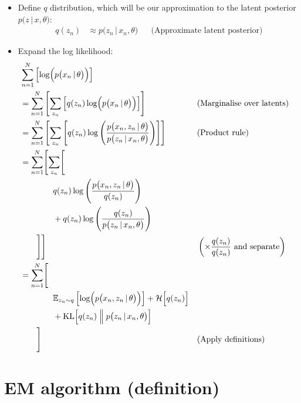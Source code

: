 \documentclass{article}
\begin{document}
\begin{itemize}
    \item Define $q$ distribution, which will be our approximation to the latent posterior $p\bigl( z \,\vert\, x, \theta \bigr)$:
    \begin{align}
        q(z_n) &\approx p\bigl( z_n \,\vert\, x_n, \theta \bigr) && \text{(Approximate latent posterior)}
    \end{align}
    \item Expand the log likelihood:
    \begin{align}
        & \sum_{n=1}^N \left[ \log\Bigl( p\bigl(x_n \,\vert\, \theta\bigr) \Bigr) \right] \nonumber \\
        &= \sum_{n=1}^N \left[ \sum_{z_n} \left[ q(z_n)\log\Bigl( p\bigl(x_n \,\vert\, \theta\bigr) \Bigr) \right] \right] && \text{(Marginalise over latents)} \\
        &= \sum_{n=1}^N \left[ \sum_{z_n} \left[ q(z_n)\log\left( \frac{p\bigl(x_n, z_n \,\vert\, \theta\bigr)}{p\bigl(z_n \,\vert\, x_n, \theta\bigr)} \right) \right] \right] && \text{(Product rule)} \label{eq:first product rule} \\
        &= \sum_{n=1}^N \Biggl[ \sum_{z_n} \Biggl[ \nonumber \\
        &\qquad\qquad q(z_n)\log\left( \frac{p\bigl(x_n, z_n \,\vert\, \theta\bigr)}{q(z_n)} \right) \nonumber \\
        &\qquad\qquad +q(z_n)\log\left( \frac{q(z_n)}{p\bigl(z_n \,\vert\, x_n, \theta\bigr)} \right) \nonumber \\
        &\qquad \Biggr] \Biggr] && \left(\times \frac{q(z_n)}{q(z_n)} \text{ and separate}\right) \label{eq:NLL decomposition} \\
        &= \sum_{n=1}^N \Biggl[ \nonumber \\
        &\qquad\qquad \mathbb{E}_{z_n\sim q}\left[ \log\Bigl( p\bigl(x_n, z_n \,\vert\, \theta\bigr) \Bigr) \right] + \mathcal{H} \Bigl[ q(z_n) \Bigr] \nonumber \\
        &\qquad\qquad + \text{KL}\Bigl[ q(z_n) \Bigm\Vert p\bigl(z_n \,\vert\, x_n, \theta\bigr) \Bigr] \nonumber \\
        &\qquad \Biggr] && \text{(Apply definitions)}
    \end{align}
\end{itemize}

\newpage
\section{EM algorithm (definition)}
\end{document}
